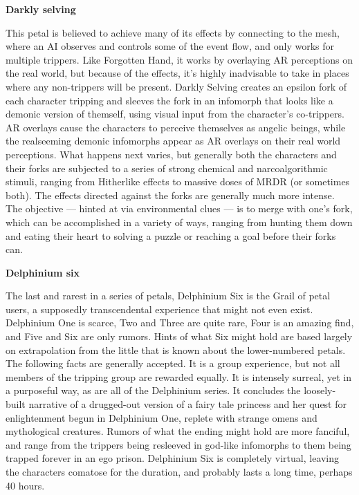 {{\textbf{Darkly selving} 

This petal is believed to achieve many of its effects by connecting to the mesh, where an AI observes and controls some of the event flow, and only works for multiple trippers. Like Forgotten Hand, it works by overlaying AR perceptions on the real world, but because of the effects, it’s highly inadvisable to take in places where any non-trippers will be present. Darkly Selving creates an epsilon fork of each character tripping and sleeves the fork in an infomorph that looks like a demonic version of themself, using visual input from the character’s co-trippers. AR overlays cause the characters to perceive themselves as angelic beings, while the realseeming demonic infomorphs appear as AR overlays on their real world perceptions. What happens next varies, but generally both the characters and their forks are subjected to a series of strong chemical and narcoalgorithmic stimuli, ranging from Hitherlike effects to massive doses of MRDR (or sometimes both). The effects directed against the forks are generally much more intense. The objective --- hinted at via environmental clues --- is to merge with one’s fork, which can be accomplished in a variety of ways, ranging from hunting them down and eating their heart to solving a puzzle or reaching a goal before their forks can. 

\textbf{Delphinium six} 

The last and rarest in a series of petals, Delphinium Six is the Grail of petal users, a supposedly transcendental experience that might not even exist. Delphinium One is scarce, Two and Three are quite rare, Four is an amazing find, and Five and Six are only rumors. Hints of what Six might hold are based largely on extrapolation from the little that is known about the lower-numbered petals. The following facts are generally accepted. It is a group experience, but not all members of the tripping group are rewarded equally. It is intensely surreal, yet in a purposeful way, as are all of the Delphinium series. It concludes the loosely-built narrative of a drugged-out version of a fairy tale princess and her quest for enlightenment begun in Delphinium One, replete with strange omens and mythological creatures. Rumors of what the ending might hold are more fanciful, and range from the trippers being resleeved in god-like infomorphs to them being trapped forever in an ego prison. Delphinium Six is completely virtual, leaving the characters comatose for the duration, and probably lasts a long time, perhaps 40 hours. 

}}
